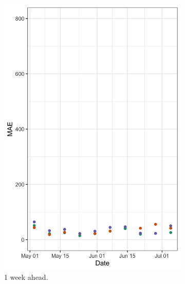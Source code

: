\documentclass[11pt]{amsart}
\begin{document}
\begin{figure}
  \centering
     \begin{subfigure}{.5\textwidth}
  \centering
    \includegraphics[scale=.15]{ablation_1.png}
    \caption{1 week ahead.}
\end{subfigure}%
\begin{subfigure}{.5\textwidth}
  \centering

\end{subfigure}
\end{figure}
\end{document}
